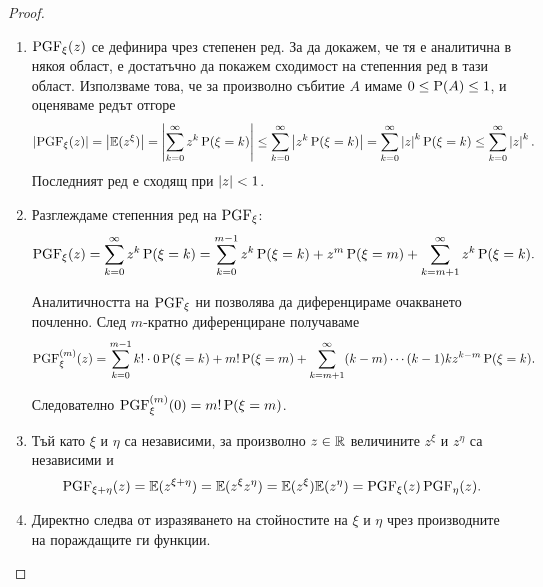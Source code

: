 \documentclass[numbers=endperiod, DIV=15, bibliography=totocnumbered]{scrartcl}
\begin{document}
\begin{proof}
  \mbox{}
  \begin{enumerate}
    \item $\operatorname{PGF}_\xi(z)$ се дефинира чрез степенен ред. За да докажем, че тя е аналитична в някоя област, е достатъчно да покажем сходимост на степенния ред в тази област. Използваме това, че за произволно събитие $A$ имаме $0 \leq \operatorname{P}(A) \leq 1$, и оценяваме редът отгоре
    \begin{displaymath}
      \left\vert \operatorname{PGF}_\xi(z) \right\vert
      =
      \left\vert \mathbb{E}(z^\xi) \right\vert
      =
      \left\vert \sum_{k=0}^\infty z^k \operatorname{P}(\xi = k) \right\vert
      \leq
      \sum_{k=0}^\infty \left\vert z^k \operatorname{P}(\xi = k) \right\vert
      =
      \sum_{k=0}^\infty \left\vert z \right\vert^k \operatorname{P}(\xi = k)
      \leq
      \sum_{k=0}^\infty \left\vert z \right\vert^k.
    \end{displaymath}
    Последният ред е сходящ при $\left\vert z \right\vert < 1$.

    \item Разглеждаме степенния ред на $\operatorname{PGF}_\xi$:
    \begin{displaymath}
      \operatorname{PGF}_\xi(z)
      =
      \sum_{k=0}^\infty z^k \operatorname{P}(\xi = k)
      =
      \sum_{k=0}^{m-1} z^k \operatorname{P}(\xi = k) + z^m \operatorname{P}(\xi = m) + \sum_{k=m+1}^\infty z^k \operatorname{P}(\xi = k).
    \end{displaymath}

    Аналитичността на $\operatorname{PGF}_\xi$ ни позволява да диференцираме очакването почленно. След $m$-кратно диференциране получаваме
    \begin{displaymath}
      \operatorname{PGF}_\xi^{(m)}(z)
      =
      \sum_{k=0}^{m-1} k! \cdot 0 \operatorname{P}(\xi = k) + m! \operatorname{P}(\xi = m) + \sum_{k=m+1}^\infty (k-m) \cdots (k-1) k z^{k-m} \operatorname{P}(\xi = k).
    \end{displaymath}

    Следователно $\operatorname{PGF}_\xi^{(m)}(0) = m! \operatorname{P}(\xi = m)$.

    \item Тъй като $\xi$ и $\eta$ са независими, за произволно $z \in \mathbb{R}$ величините $z^\xi$ и $z^\eta$ са независими и
    \begin{displaymath}
      \operatorname{PGF}_{\xi + \eta}(z)
      =
      \mathbb{E}(z^{\xi + \eta})
      =
      \mathbb{E}(z^\xi z^\eta)
      =
      \mathbb{E}(z^\xi) \mathbb{E}(z^\eta)
      =
      \operatorname{PGF}_\xi(z) \operatorname{PGF}_\eta(z).
    \end{displaymath}

    \item Директно следва от изразяването на стойностите на $\xi$ и $\eta$ чрез производните на пораждащите ги функции.
  \end{enumerate}
\end{proof}
\end{document}
